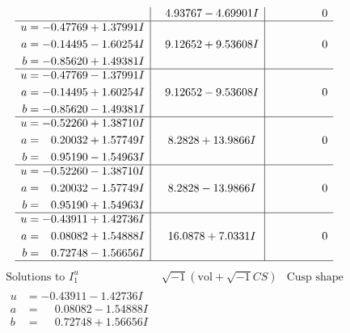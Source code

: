 \documentclass[1p]{elsarticle_modified}
\theoremstyle{definition}
\newcommand{\I}{\sqrt{-1}}
\begin{document}
$$\begin{array}{c|c|c}
 & \phantom{-}4.93767 - 4.69901 I & \phantom{-0.000000 } 0 \\ \hline\begin{aligned}
u &= -0.47769 + 1.37991 I \\
a &= -0.14495 - 1.60254 I \\
b &= -0.85620 + 1.49381 I\end{aligned}
 & \phantom{-}9.12652 + 9.53608 I & \phantom{-0.000000 } 0 \\ \hline\begin{aligned}
u &= -0.47769 - 1.37991 I \\
a &= -0.14495 + 1.60254 I \\
b &= -0.85620 - 1.49381 I\end{aligned}
 & \phantom{-}9.12652 - 9.53608 I & \phantom{-0.000000 } 0 \\ \hline\begin{aligned}
u &= -0.52260 + 1.38710 I \\
a &= \phantom{-}0.20032 + 1.57749 I \\
b &= \phantom{-}0.95190 - 1.54963 I\end{aligned}
 & \phantom{-}8.2828 + 13.9866 I & \phantom{-0.000000 } 0 \\ \hline\begin{aligned}
u &= -0.52260 - 1.38710 I \\
a &= \phantom{-}0.20032 - 1.57749 I \\
b &= \phantom{-}0.95190 + 1.54963 I\end{aligned}
 & \phantom{-}8.2828 - 13.9866 I & \phantom{-0.000000 } 0 \\ \hline\begin{aligned}
u &= -0.43911 + 1.42736 I \\
a &= \phantom{-}0.08082 + 1.54888 I \\
b &= \phantom{-}0.72748 - 1.56656 I\end{aligned}
 & \phantom{-}16.0878 + 7.0331 I & \phantom{-0.000000 } 0\\
 \hline 
 \end{array}$$\newpage$$\begin{array}{c|c|c}  
\text{Solutions to }I^u_{1}& \I (\text{vol} + \sqrt{-1}CS) & \text{Cusp shape}\\
 \hline 
\begin{aligned}
u &= -0.43911 - 1.42736 I \\
a &= \phantom{-}0.08082 - 1.54888 I \\
b &= \phantom{-}0.72748 + 1.56656 I\end{aligned}

\end{array}$$
\end{document}
